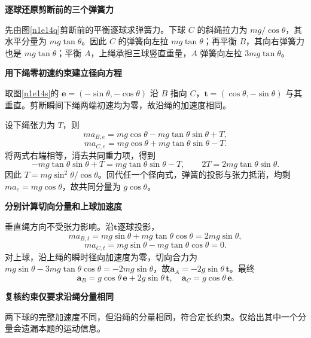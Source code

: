 \begin{solution}\textbf{逐球还原剪断前的三个弹簧力}\par\nobreak
先由图\ref{n1e14q}剪断前的平衡逐球求弹簧力。下球 $C$ 的斜绳拉力为 $mg/\cos\theta$，其水平分量为 $mg\tan\theta$。因此 $C$ 的弹簧向左拉 $mg\tan\theta$；再平衡 $B$，其向右弹簧力也是 $mg\tan\theta$；平衡 $A$，上绳承担三球竖直重量，$A$ 弹簧向左拉 $3mg\tan\theta$。



\par\medskip{}\noindent\textbf{用下绳零初速约束建立径向方程}\par\nobreak
取图\ref{n1e14s}的 $\bm e=(-\sin\theta,-\cos\theta)$ 沿 $B$ 指向 $C$，$\bm t=(\cos\theta,-\sin\theta)$ 与其垂直。剪断瞬间下绳两端初速均为零，故沿绳的加速度相同。

设下绳张力为 $T$，则
\[
 ma_{B,e}=mg\cos\theta-mg\tan\theta\sin\theta+T,
\]
\[
 ma_{C,e}=mg\cos\theta+mg\tan\theta\sin\theta-T.
\]
将两式右端相等，消去共同重力项，得到
\[
 -mg\tan\theta\sin\theta+T
 =mg\tan\theta\sin\theta-T,
 \qquad 2T=2mg\tan\theta\sin\theta.
\]
因此 $T=mg\sin^2\theta/\cos\theta$。回代任一个径向式，弹簧的投影与张力抵消，均剩 $ma_e=mg\cos\theta$，故共同分量为 $g\cos\theta$。

\par\medskip{}\noindent\textbf{分别计算切向分量和上球加速度}\par\nobreak
垂直绳方向不受张力影响。沿$\bm t$逐球投影，
\[
ma_{B,t}=mg\sin\theta+mg\tan\theta\cos\theta=2mg\sin\theta,
\]
\[
ma_{C,t}=mg\sin\theta-mg\tan\theta\cos\theta=0.
\]
对上球，沿上绳的瞬时径向加速度为零，切向合力为$mg\sin\theta-3mg\tan\theta\cos\theta=-2mg\sin\theta$，故$\bm a_A=-2g\sin\theta\,\bm t$。最终
\[
 \bm a_B=g\cos\theta\,\bm e+2g\sin\theta\,\bm t,
 \quad\bm a_C=g\cos\theta\,\bm e.
\]


\par\medskip{}\noindent\textbf{复核约束仅要求沿绳分量相同}\par\nobreak
两下球的完整加速度不同，但沿绳的分量相同，符合定长约束。仅给出其中一个分量会遗漏本题的运动信息。

\end{solution}

